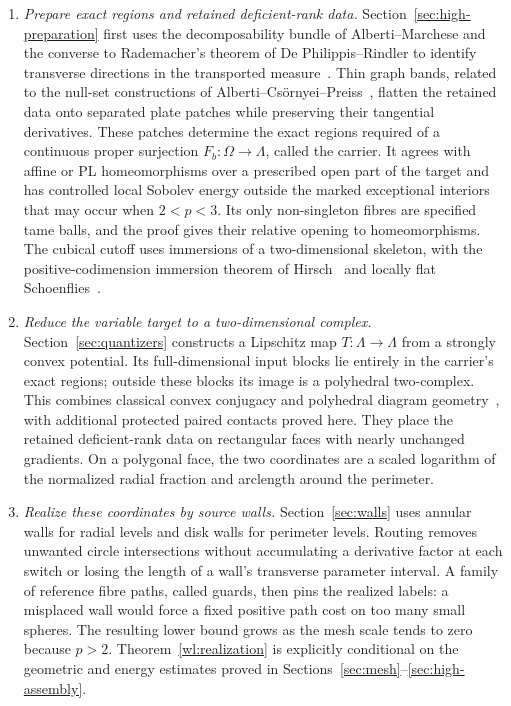 \begin{enumerate}
\item \emph{Prepare exact regions and retained deficient-rank data.}
Section~\ref{sec:high-preparation} first uses the decomposability bundle
of Alberti--Marchese and the converse to Rademacher's theorem of
De Philippis--Rindler to identify transverse directions in the transported
measure~\cite{AlbertiMarchese2016,DePhilippisRindler2016}.
Thin graph bands, related to the null-set constructions of
Alberti--Cs\"ornyei--Preiss~\cite{AlbertiCsornyeiPreiss2010}, flatten
the retained data onto separated plate patches while preserving
their tangential derivatives.  These patches determine the exact
regions required of a continuous proper surjection
$F_b:\Omega\to\Lambda$, called the carrier.  It agrees with affine
or PL homeomorphisms over a prescribed open part of the target and
has controlled local Sobolev energy outside the marked exceptional
interiors that may occur when $2<p<3$.  Its only non-singleton fibres
are specified tame balls, and the proof gives their relative opening
to homeomorphisms.  The cubical cutoff uses immersions of a
two-dimensional skeleton, with the positive-codimension immersion
theorem of Hirsch~\cite{Hirsch1959} and locally flat
Schoenflies~\cite{Brown1960}.

\item \emph{Reduce the variable target to a two-dimensional complex.}
Section~\ref{sec:quantizers} constructs a Lipschitz map
$T:\Lambda\to\Lambda$ from a strongly convex potential.
Its full-dimensional input blocks lie entirely in the carrier's exact
regions; outside these blocks its image is a polyhedral two-complex.
This combines classical convex conjugacy and polyhedral diagram
geometry~\cite{Moreau1965,Aurenhammer1987}, with additional protected
paired contacts proved here.  They place the retained deficient-rank
data on rectangular faces with nearly unchanged gradients.
On a polygonal face, the two coordinates are a scaled logarithm of
the normalized radial fraction and arclength around the perimeter.

\item \emph{Realize these coordinates by source walls.}
Section~\ref{sec:walls} uses annular walls for radial levels and
disk walls for perimeter levels.  Routing removes unwanted
circle intersections without accumulating a derivative factor at
each switch or losing the length of a wall's transverse parameter
interval.  A family of reference fibre paths, called guards,
then pins the realized labels: a misplaced wall would force a
fixed positive path cost on too many small spheres.  The resulting
lower bound grows as the mesh scale tends to zero because $p>2$.
Theorem~\ref{wl:realization} is explicitly conditional on the
geometric and energy estimates proved in
Sections~\ref{sec:mesh}--\ref{sec:high-assembly}.


\end{enumerate}
